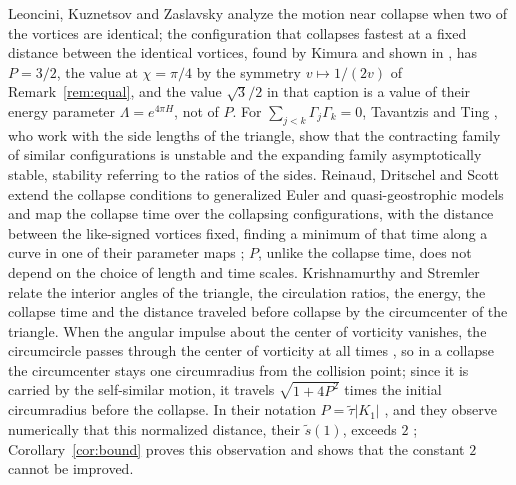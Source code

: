 \documentclass[11pt]{article}
\theoremstyle{definition}
\begin{document}
Leoncini, Kuznetsov and Zaslavsky \cite{lkz2000} analyze the motion near collapse when two of the vortices are identical; the configuration that collapses fastest at a fixed distance between the identical vortices, found by Kimura \cite[Eq.~(4.6)]{kimura1987} and shown in \cite[Fig.~18]{lkz2000}, has $P = 3/2$, the value at $\chi = \pi/4$ by the symmetry $v \mapsto 1/(2v)$ of Remark~\ref{rem:equal}, and the value $\sqrt{3}/2$ in that caption is a value of their energy parameter $\Lambda = e^{4\pi H}$, not of $P$. For $\sum_{j<k} \Gamma_j \Gamma_k = 0$, Tavantzis and Ting \cite[Sect.~II]{tt1988}, who work with the side lengths of the triangle, show that the contracting family of similar configurations is unstable and the expanding family asymptotically stable, stability referring to the ratios of the sides. Reinaud, Dritschel and Scott \cite{rds2022} extend the collapse conditions to generalized Euler and quasi-geostrophic models and map the collapse time over the collapsing configurations, with the distance between the like-signed vortices fixed, finding a minimum of that time along a curve in one of their parameter maps \cite[Fig.~3]{rds2022}; $P$, unlike the collapse time, does not depend on the choice of length and time scales. Krishnamurthy and Stremler \cite[Sects.~3.3--3.5]{ks2018} relate the interior angles of the triangle, the circulation ratios, the energy, the collapse time and the distance traveled before collapse by the circumcenter of the triangle. When the angular impulse about the center of vorticity vanishes, the circumcircle passes through the center of vorticity at all times \cite[Eq.~(40)]{kas2018}, so in a collapse the circumcenter stays one circumradius from the collision point; since it is carried by the self-similar motion, it travels $\sqrt{1 + 4P^2}$ times the initial circumradius before the collapse. In their notation $P = \tilde\tau |K_1|$ \cite[Eq.~(3.28a)]{ks2018}, and they observe numerically that this normalized distance, their $\tilde s(1)$, exceeds $2$ \cite[Sect.~3.5]{ks2018}; Corollary~\ref{cor:bound} proves this observation and shows that the constant $2$ cannot be improved.
\end{document}
